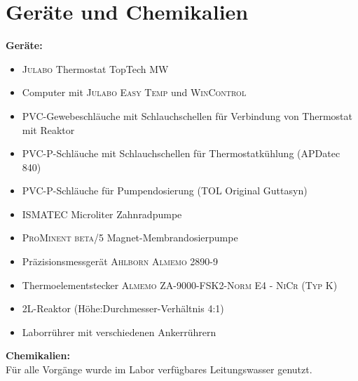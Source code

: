 \section{Geräte und Chemikalien}
\label{sec:geraete}

\textbf{Geräte:}
\begin{itemize}
	\item \textsc{Julabo} Thermostat TopTech MW
	\item Computer mit \textsc{Julabo Easy Temp} und \textsc{WinControl}
	\item PVC-Gewebeschläuche mit Schlauchschellen für Verbindung von Thermostat mit Reaktor
	\item PVC-P-Schläuche mit Schlauchschellen für Thermostatkühlung (APDatec 840) 
	\item PVC-P-Schläuche für Pumpendosierung (TOL Original Guttasyn)
	\item \textsc{ISMATEC} Microliter Zahnradpumpe
	\item \textsc{ProMinent beta/5} Magnet-Membrandosierpumpe 
	\item Präzisionsmessgerät \textsc{Ahlborn Almemo 2890-9}
	\item Thermoelementstecker \textsc{Almemo ZA-9000-FSK2-Norm E4 - NiCr (Typ K)}
	\item 2L-Reaktor (Höhe:Durchmesser-Verhältnis 4:1)
	\item Laborrührer mit verschiedenen Ankerrührern
\end{itemize}

\textbf{Chemikalien:}\\
Für alle Vorgänge wurde im Labor verfügbares Leitungswasser genutzt.